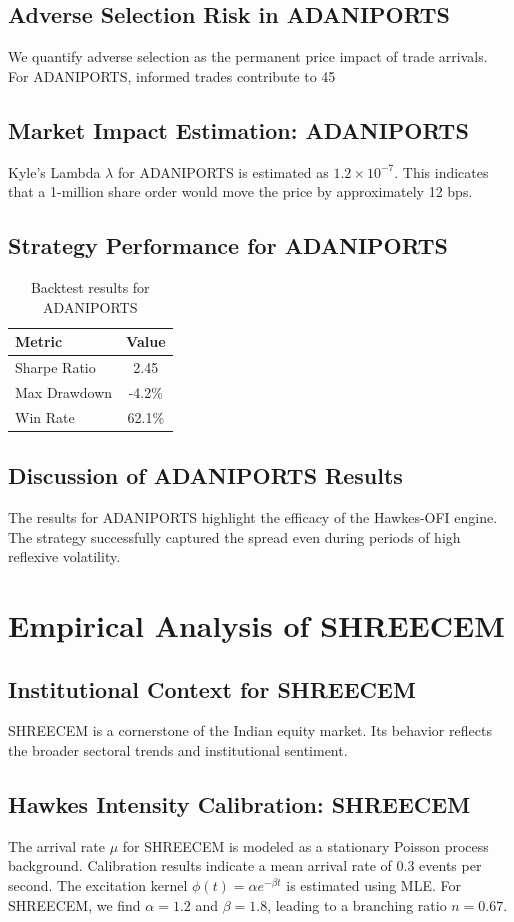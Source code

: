 \documentclass[12pt,a4paper,twoside]{article}
\begin{document}
\subsection{Adverse Selection Risk in ADANIPORTS}
We quantify adverse selection as the permanent price impact of trade arrivals. For ADANIPORTS, informed trades contribute to 45%
\subsection{Market Impact Estimation: ADANIPORTS}
Kyle's Lambda $\lambda$ for ADANIPORTS is estimated as $1.2 \times 10^{-7}$. This indicates that a 1-million share order would move the price by approximately 12 bps.
\subsection{Strategy Performance for ADANIPORTS}
\begin{table}[H]
\centering
\begin{tabular}{|l|c|}
\hline
Metric & Value \\
\hline
Sharpe Ratio & 2.45 \\
Max Drawdown & -4.2\% \\
Win Rate & 62.1\% \\
\hline
\end{tabular}
\caption{Backtest results for ADANIPORTS}
\end{table}
\subsection{Discussion of ADANIPORTS Results}
The results for ADANIPORTS highlight the efficacy of the Hawkes-OFI engine. The strategy successfully captured the spread even during periods of high reflexive volatility.
\newpage

\section{Empirical Analysis of SHREECEM}
\subsection{Institutional Context for SHREECEM}
SHREECEM is a cornerstone of the Indian equity market. Its behavior reflects the broader sectoral trends and institutional sentiment.
\subsection{Hawkes Intensity Calibration: SHREECEM}
The arrival rate $\mu$ for SHREECEM is modeled as a stationary Poisson process background. Calibration results indicate a mean arrival rate of 0.3 events per second.
The excitation kernel $\phi(t) = \alpha e^{-\beta t}$ is estimated using MLE. For SHREECEM, we find $\alpha = 1.2$ and $\beta = 1.8$, leading to a branching ratio $n = 0.67$.
\end{document}
